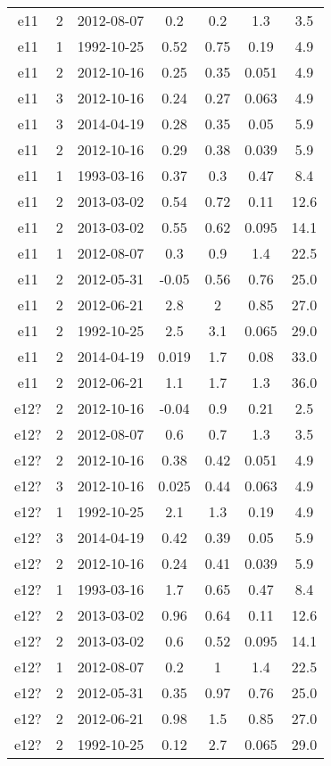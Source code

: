 \begin{table*}[htp]
\begin{tabular}{ccccccc}
e11 & 2 & 2012-08-07 & 0.2 & 0.2 & 1.3 & 3.5 \\
e11 & 1 & 1992-10-25 & 0.52 & 0.75 & 0.19 & 4.9 \\
e11 & 2 & 2012-10-16 & 0.25 & 0.35 & 0.051 & 4.9 \\
e11 & 3 & 2012-10-16 & 0.24 & 0.27 & 0.063 & 4.9 \\
e11 & 3 & 2014-04-19 & 0.28 & 0.35 & 0.05 & 5.9 \\
e11 & 2 & 2012-10-16 & 0.29 & 0.38 & 0.039 & 5.9 \\
e11 & 1 & 1993-03-16 & 0.37 & 0.3 & 0.47 & 8.4 \\
e11 & 2 & 2013-03-02 & 0.54 & 0.72 & 0.11 & 12.6 \\
e11 & 2 & 2013-03-02 & 0.55 & 0.62 & 0.095 & 14.1 \\
e11 & 1 & 2012-08-07 & 0.3 & 0.9 & 1.4 & 22.5 \\
e11 & 2 & 2012-05-31 & -0.05 & 0.56 & 0.76 & 25.0 \\
e11 & 2 & 2012-06-21 & 2.8 & 2 & 0.85 & 27.0 \\
e11 & 2 & 1992-10-25 & 2.5 & 3.1 & 0.065 & 29.0 \\
e11 & 2 & 2014-04-19 & 0.019 & 1.7 & 0.08 & 33.0 \\
e11 & 2 & 2012-06-21 & 1.1 & 1.7 & 1.3 & 36.0 \\
e12? & 2 & 2012-10-16 & -0.04 & 0.9 & 0.21 & 2.5 \\
e12? & 2 & 2012-08-07 & 0.6 & 0.7 & 1.3 & 3.5 \\
e12? & 2 & 2012-10-16 & 0.38 & 0.42 & 0.051 & 4.9 \\
e12? & 3 & 2012-10-16 & 0.025 & 0.44 & 0.063 & 4.9 \\
e12? & 1 & 1992-10-25 & 2.1 & 1.3 & 0.19 & 4.9 \\
e12? & 3 & 2014-04-19 & 0.42 & 0.39 & 0.05 & 5.9 \\
e12? & 2 & 2012-10-16 & 0.24 & 0.41 & 0.039 & 5.9 \\
e12? & 1 & 1993-03-16 & 1.7 & 0.65 & 0.47 & 8.4 \\
e12? & 2 & 2013-03-02 & 0.96 & 0.64 & 0.11 & 12.6 \\
e12? & 2 & 2013-03-02 & 0.6 & 0.52 & 0.095 & 14.1 \\
e12? & 1 & 2012-08-07 & 0.2 & 1 & 1.4 & 22.5 \\
e12? & 2 & 2012-05-31 & 0.35 & 0.97 & 0.76 & 25.0 \\
e12? & 2 & 2012-06-21 & 0.98 & 1.5 & 0.85 & 27.0 \\
e12? & 2 & 1992-10-25 & 0.12 & 2.7 & 0.065 & 29.0 \\

\end{tabular}
\end{table*}
